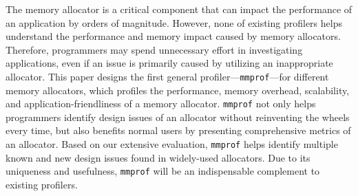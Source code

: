 The memory allocator is a critical component that can impact the performance of an application by orders of magnitude. However, none of existing profilers helps understand the performance and memory impact caused by memory allocators. Therefore, programmers may spend unnecessary effort in investigating applications, even if an  issue is primarily caused by utilizing an inappropriate allocator. This paper designs the first general profiler---\texttt{mmprof}---for different memory allocators, which profiles the performance, memory overhead, scalability, and application-friendliness of a memory allocator. \texttt{mmprof} not only helps programmers identify design issues of an allocator without reinventing the wheels every time, but also benefits normal users by presenting comprehensive metrics of an allocator. Based on our extensive evaluation, \texttt{mmprof} helps identify multiple known and new design issues found in widely-used allocators. 
Due to its uniqueness and usefulness, \texttt{mmprof} will be an indispensable complement to existing profilers. 


 